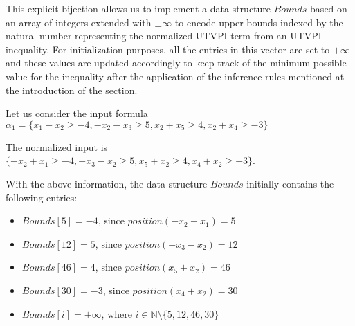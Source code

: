 This explicit bijection allows us to implement a data 
structure $Bounds$ based on an array of integers extended
with $\pm \infty$ to encode upper bounds indexed by the
natural number representing the normalized UTVPI term
from an UTVPI inequality.
For initialization purposes, all 
the entries in this vector are set to
$+\infty$ and these values are updated accordingly 
to keep track of the minimum possible value 
for the inequality after the application of the 
inference rules mentioned at the
introduction of the section.

\begin{example}
  Let us consider the input formula 
  $\alpha_1 = \{x_1 - x_2 \geq -4, -x_2 - x_3 \geq 5, 
  x_2 + x_5 \geq 4, x_2 + x_4 \geq -3\}$

  The normalized input is $\{-x_2 + x_1 \geq -4, -x_3 - x_2 \geq 5, 
  x_5 + x_2 \geq 4, x_4 + x_2 \geq -3\}$.

  With the above information, the data structure $Bounds$ initially contains
  the following entries:

  \begin{itemize}
    \item[] $Bounds[5] = -4$, since $position(-x_2 + x_1) = 5$
    \item[] $Bounds[12] = 5$, since $position(-x_3 - x_2) = 12$
    \item[] $Bounds[46] = 4$, since $position(x_5 + x_2) = 46$
    \item[] $Bounds[30] = -3$, since $position(x_4 + x_2) = 30$
    \item[] $Bounds[i] = +\infty$, where $i \in \mathbb{N} \setminus \{5, 12, 46, 30\}$
  \end{itemize}


  
\end{example}

